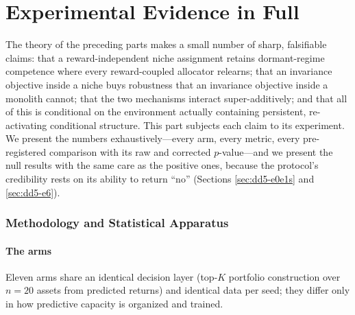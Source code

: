 
\part{Experimental Evidence in Full}
\label{sec:dd5-part}

The theory of the preceding parts makes a small number of sharp, falsifiable
claims: that a reward-independent niche assignment retains dormant-regime
competence where every reward-coupled allocator relearns; that an invariance
objective inside a niche buys robustness that an invariance objective inside a
monolith cannot; that the two mechanisms interact super-additively; and that
all of this is conditional on the environment actually containing persistent,
re-activating conditional structure. This part subjects each claim to its
experiment. We present the numbers exhaustively---every arm, every metric,
every pre-registered comparison with its raw and corrected $p$-value---and we
present the null results with the same care as the positive ones, because the
protocol's credibility rests on its ability to return ``no'' (Sections
\ref{sec:dd5-e0e1s} and \ref{sec:dd5-e6}).

\section{Methodology and Statistical Apparatus}
\label{sec:dd5-method}

\subsection{The arms}
\label{sec:dd5-arms}

Eleven arms share an identical decision layer (top-$K$ portfolio construction
over $n=20$ assets from predicted returns) and identical data per seed; they
differ only in how predictive capacity is organized and trained.

